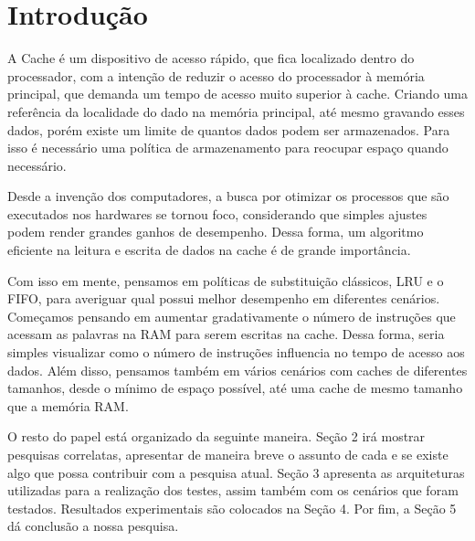 \section{Introdução}


    A Cache é um dispositivo de acesso rápido, que fica localizado dentro do processador,
    com a intenção de reduzir o acesso do processador à memória principal, que demanda um
    tempo de acesso muito superior à cache. Criando uma referência da localidade do dado na 
    memória principal, até mesmo gravando esses dados, porém existe um limite de quantos 
    dados podem ser armazenados. Para isso é necessário uma política de armazenamento para 
    reocupar espaço quando necessário.

    Desde a invenção dos computadores, a busca por otimizar os processos que são executados 
    nos hardwares se tornou foco, considerando que simples ajustes podem render grandes 
    ganhos de desempenho. Dessa forma, um algoritmo eficiente na leitura e escrita de 
    dados na cache é de grande importância. 

    Com isso em mente, pensamos em políticas de substituição clássicos, LRU e o FIFO, para
    averiguar qual possui melhor desempenho em diferentes cenários. Começamos pensando em 
    aumentar gradativamente o número de instruções que acessam as palavras na RAM para serem 
    escritas na cache. Dessa forma, seria simples visualizar como o número de instruções
    influencia no tempo de acesso aos dados. Além disso, pensamos também em vários cenários 
    com caches de diferentes tamanhos, desde o mínimo de espaço possível, até uma cache 
    de mesmo tamanho que a memória RAM.

    O resto do papel está organizado da seguinte maneira. Seção 2 irá mostrar pesquisas correlatas,
    apresentar de maneira breve o assunto de cada e se existe algo que possa contribuir com a pesquisa atual.
    Seção 3 apresenta as arquiteturas utilizadas para a realização dos testes, assim também com os cenários 
    que foram testados. Resultados experimentais são colocados na Seção 4. Por fim, a Seção 5 dá conclusão 
    a nossa pesquisa.
